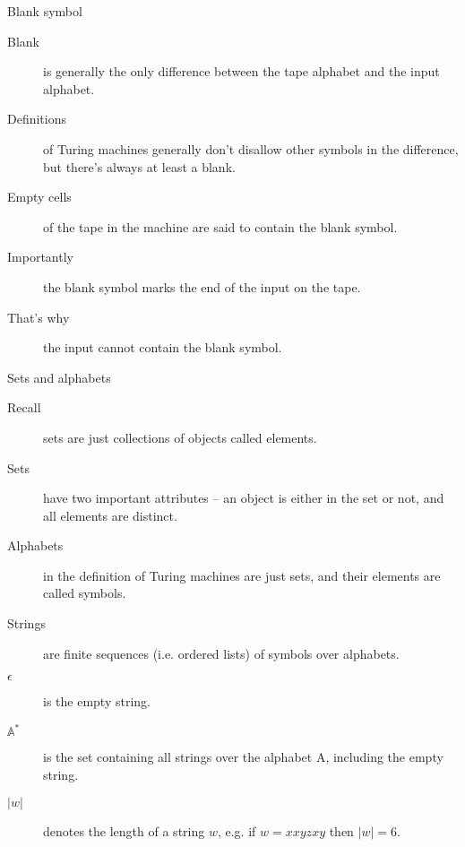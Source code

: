 \documentclass[dvipsnames, hidelinks]{beamer}
\begin{document}
\begin{frame}{Blank symbol}

\begin{description}
  \item[Blank] is generally the only difference between the tape alphabet and the input alphabet.
  \item[Definitions] of Turing machines generally don't disallow other symbols in the difference, but there's always at least a blank.
  \item[Empty cells] of the tape in the machine are said to contain the blank symbol.
  \item[Importantly] the blank symbol marks the end of the input on the tape.
  \item[That's why] the input cannot contain the blank symbol.
\end{description}

\end{frame}


\begin{frame}{Sets and alphabets}

\begin{description}
  \item[Recall] sets are just collections of objects called elements.
  \item[Sets] have two important attributes -- an object is either in the set or not, and all elements are distinct.
  \item[Alphabets] in the definition of Turing machines are just sets, and their elements are called symbols.
  \item[Strings] are finite sequences (i.e. ordered lists) of symbols over alphabets.
  \item[$\epsilon$] is the empty string.
  \item[$\mathbb{A}^*$] is the set containing all strings over the alphabet A, including the empty string.
  \item[$|w|$] denotes the length of a string $w$, e.g. if $w = xxyzxy$ then $|w| = 6$.
\end{description}
\end{frame}
\end{document}
